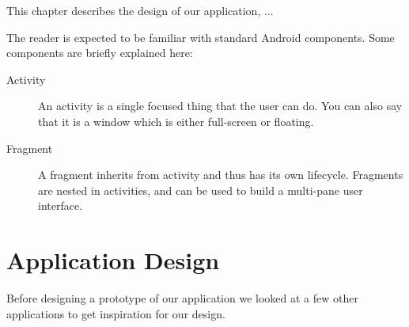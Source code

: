 This chapter describes the design of our application, ... 

The reader is expected to be familiar with standard Android components. Some components are briefly explained here:
\begin{description}
\item[Activity] An activity is a single focused thing that the user can do. You can also say that it is a window which is either full-screen or floating. \citep{activity}
\item[Fragment] A fragment inherits from activity and thus has its own lifecycle. Fragments are nested in activities, and can be used to build a multi-pane user interface. \citep{fragment}
\end{description}

\section{Application Design}\label{sec:appdesign}

Before designing a prototype of our application we looked at a few other applications to get inspiration for our design.

